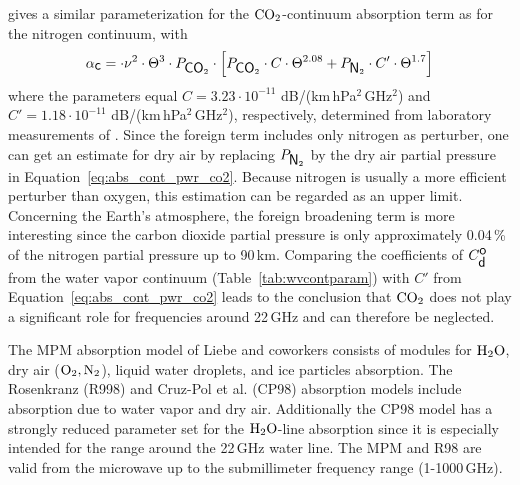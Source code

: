{
\label{leveld:co2cont}
\citet{pwr:93} gives a similar parameterization for the $\mbox{CO}_2$-continuum 
absorption term as for the nitrogen continuum, with 
\begin{equation}
  \label{eq:abs_cont_pwr_co2}
    \alpha_{\mbox{\sf c}} =   \cdot \nu^2 \cdot  \Theta^{3} \cdot P_{\mbox{\sf CO}_{2}}  \cdot 
                  \left[ P_{\mbox{\sf CO}_{2}} \cdot C  \cdot \Theta^{2.08} +
                    P_{\mbox{\sf N}_{2}}  \cdot C' \cdot \Theta^{1.7} \right]
\end{equation}
where the parameters equal $C = 3.23\cdot 10^{-11}$
dB/(km\,hPa$^2$\,GHz$^2$) and $C' = 1.18\cdot 10^{-11}$
dB/(km\,hPa$^2$\,GHz$^2$), respectively, determined from laboratory
measurements of \citep{ho:66,dagg:75}.  Since the foreign term
includes only nitrogen as perturber, one can get an estimate for dry
air by replacing $P_{\mbox{\sf N}_{2}}$ by the dry air partial pressure in
Equation~\ref{eq:abs_cont_pwr_co2}. Because nitrogen is usually a more
efficient perturber than oxygen, this estimation can be regarded as an
upper limit. Concerning the Earth's atmosphere, the foreign broadening
term is more interesting since the carbon dioxide partial pressure is
only approximately 0.04\,\% of the nitrogen partial pressure up to
90\,km. Comparing the coefficients of $C^{\mbox{\sf o}}_{\mbox{\sf d}}$ from the water vapor
continuum (Table~\ref{tab:wvcontparam}) with $C'$ from
Equation~\ref{eq:abs_cont_pwr_co2} leads to the conclusion that
$\mbox{CO}_2$ does not play a significant role for frequencies around 22\,GHz
and can therefore be neglected.



\label{levelc:ArtsImplementationContinuum}




\label{levelb:CompAbsMod}
The MPM absorption model of Liebe and coworkers consists of modules for 
$\mbox{H}_2\mbox{O}$, dry air ($\mbox{O}_2, \mbox{N}_2$), liquid water droplets, and ice particles 
absorption. The Rosenkranz (R998) and Cruz-Pol et al. (CP98) absorption 
models include absorption due to water vapor and dry air. Additionally 
the CP98 model has a strongly reduced parameter set for the $\mbox{H}_2\mbox{O}$-line 
absorption since it is especially intended for the range around the 
22\,GHz water line. The MPM and R98 are valid from the microwave 
up to the submillimeter frequency range (1-1000\,GHz).

}
